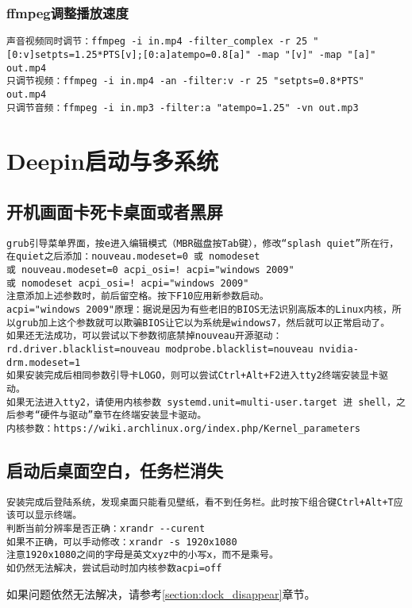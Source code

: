 \documentclass[a4paper,fontset=fandol,zihao=-4,linespread=1.2,oneside]{ctexbook}
\begin{document}
\subsection{ffmpeg调整播放速度}
\begin{lstlisting}
声音视频同时调节：ffmpeg -i in.mp4 -filter_complex -r 25 "[0:v]setpts=1.25*PTS[v];[0:a]atempo=0.8[a]" -map "[v]" -map "[a]" out.mp4
只调节视频：ffmpeg -i in.mp4 -an -filter:v -r 25 "setpts=0.8*PTS" out.mp4
只调节音频：ffmpeg -i in.mp3 -filter:a "atempo=1.25" -vn out.mp3
\end{lstlisting}


\chapter{Deepin启动与多系统}

\section{开机画面卡死卡桌面或者黑屏}
\begin{lstlisting}
grub引导菜单界面，按e进入编辑模式（MBR磁盘按Tab键），修改“splash quiet”所在行，在quiet之后添加：nouveau.modeset=0 或 nomodeset
或 nouveau.modeset=0 acpi_osi=! acpi="windows 2009"
或 nomodeset acpi_osi=! acpi="windows 2009"
注意添加上述参数时，前后留空格。按下F10应用新参数启动。
acpi="windows 2009"原理：据说是因为有些老旧的BIOS无法识别高版本的Linux内核，所以grub加上这个参数就可以欺骗BIOS让它以为系统是windows7，然后就可以正常启动了。
如果还无法成功，可以尝试以下参数彻底禁掉nouveau开源驱动：
rd.driver.blacklist=nouveau modprobe.blacklist=nouveau nvidia-drm.modeset=1
如果安装完成后相同参数引导卡LOGO，则可以尝试Ctrl+Alt+F2进入tty2终端安装显卡驱动。
如果无法进入tty2，请使用内核参数 systemd.unit=multi-user.target 进 shell，之后参考“硬件与驱动”章节在终端安装显卡驱动。
内核参数：https://wiki.archlinux.org/index.php/Kernel_parameters
\end{lstlisting}

\section{启动后桌面空白，任务栏消失}
\begin{lstlisting}
安装完成后登陆系统，发现桌面只能看见壁纸，看不到任务栏。此时按下组合键Ctrl+Alt+T应该可以显示终端。
判断当前分辨率是否正确：xrandr --curent
如果不正确，可以手动修改：xrandr -s 1920x1080
注意1920x1080之间的字母是英文xyz中的小写x，而不是乘号。
如仍然无法解决，尝试启动时加内核参数acpi=off
\end{lstlisting}
如果问题依然无法解决，请参考\ref{section:dock_disappear}章节。
\end{document}
